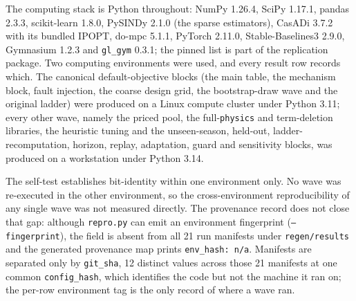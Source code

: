 The computing stack is Python throughout: NumPy 1.26.4, SciPy 1.17.1, pandas 2.3.3,
scikit-learn 1.8.0, PySINDy 2.1.0 (the sparse estimators), CasADi 3.7.2 with its bundled
IPOPT, do-mpc 5.1.1, PyTorch 2.11.0, Stable-Baselines3 2.9.0, Gymnasium 1.2.3 and
\texttt{gl\_gym} 0.3.1; the pinned list is part of the replication package. Two computing
environments were used, and every result row records which. The canonical
default-objective blocks (the main table, the mechanism block, fault injection, the
coarse design grid, the bootstrap-draw wave and the original ladder) were produced on a
Linux compute cluster under Python 3.11; every other wave, namely the priced pool, the
full-\texttt{physics} and term-deletion libraries, the heuristic tuning and the
unseen-season, held-out, ladder-recomputation, horizon, replay, adaptation, guard and
sensitivity blocks, was produced on a workstation under Python 3.14.

The self-test establishes bit-identity within one environment only. No wave was
re-executed in the other environment, so the cross-environment reproducibility of any
single wave was not measured directly. The provenance record does not close that gap:
although \texttt{repro.py} can emit an environment fingerprint (\texttt{--fingerprint}),
the field is absent from all 21 run manifests under \texttt{regen/results} and the
generated provenance map prints \texttt{env\_hash:\ n/a}. Manifests are separated only by
\texttt{git\_sha}, 12 distinct values across those 21 manifests at one common
\texttt{config\_hash}, which identifies the code but not the machine it ran on; the
per-row environment tag is the only record of where a wave ran.

